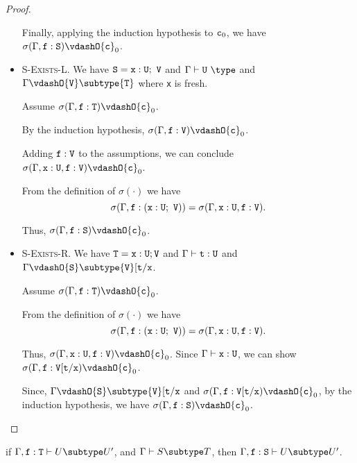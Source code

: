 \begin{proof}
\begin{itemize}
Finally,
applying the induction hypothesis to ${\tt c}_0$, we have
$\sigma(\Gamma,{\tt f}: {\tt S}) \vdashO {\tt c}_0$.

\item \textsc{S-Exists-L}.
We have
${\tt S} = {\tt x}: {\tt U};~{\tt V}$
    and
    $\Gamma \vdash {\tt U}~\type$
    and
    $\Gamma \vdashO {\tt V} \subtype {\tt T}$
    where {\tt x} is fresh.

Assume $\sigma(\Gamma,{\tt f}: {\tt T}) \vdashO {\tt c}_0$.

By the induction hypothesis,
$\sigma(\Gamma,{\tt f}: {\tt V}) \vdashO {\tt c}_0$.

Adding ${\tt f}: {\tt V}$ to the assumptions,
we can conclude
$\sigma(\Gamma, {\tt x}: {\tt U}, {\tt f}: {\tt V}) \vdashO {\tt c}_0$.

From the definition of $\sigma(\cdot)$ we have
    $$\sigma(\Gamma,{\tt f}: ({\tt x}: {\tt U};~{\tt V})) =
      \sigma(\Gamma, {\tt x}: {\tt U}, {\tt f}: {\tt V}).$$

Thus,
$\sigma(\Gamma,{\tt f}: {\tt S}) \vdashO {\tt c}_0$.

\item \textsc{S-Exists-R}.
We have
${\tt T} = {\tt x}: {\tt U}; {\tt V}$
    and
    $\Gamma \vdash {\tt t}: {\tt U}$
    and
    $\Gamma \vdashO {\tt S} \subtype {\tt V}[{\tt t}/{\tt x}$.

Assume
$\sigma(\Gamma,{\tt f}: {\tt T}) \vdashO {\tt c}_0$.

From the definition of $\sigma(\cdot)$ we have
    $$\sigma(\Gamma,{\tt f}: ({\tt x}: {\tt U};~{\tt V})) =
      \sigma(\Gamma, {\tt x}: {\tt U}, {\tt f}: {\tt V}).$$

Thus,
$\sigma(\Gamma, {\tt x}: {\tt U}, {\tt f}: {\tt V}) \vdashO {\tt c}_0$.
Since
$\Gamma \vdash {\tt x}: {\tt U}$, we can show  %
$\sigma(\Gamma, {\tt f}: {\tt V[{\tt t}/{\tt x}}) \vdashO {\tt c}_0$.

Since,
$\Gamma \vdashO {\tt S} \subtype {\tt V}[{\tt t}/{\tt x}$
and
$\sigma(\Gamma, {\tt f}: {\tt V[{\tt t}/{\tt x}}) \vdashO {\tt c}_0$,
by the induction hypothesis, we have
$\sigma(\Gamma, {\tt f}: {\tt S}) \vdashO {\tt c}_0$.
\end{itemize}
\end{proof}

\begin{lemma}
\label{subtype-lemma} %
if   $\Gamma, {\tt f}: {\tt T} \vdash U \subtype U'$,
and  $\Gamma \vdash S \subtype T$,
then $\Gamma, {\tt f}: {\tt S} \vdash U \subtype U'$.
\end{lemma}


